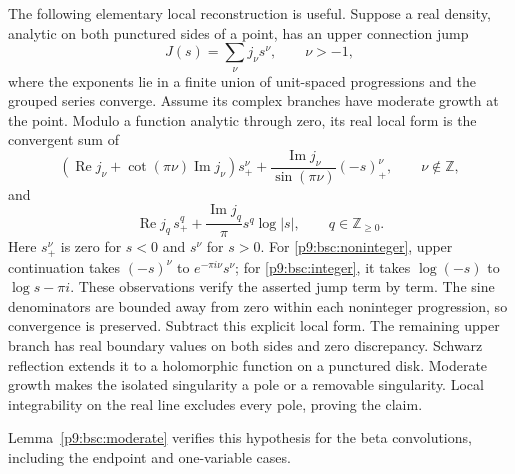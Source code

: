 \documentclass[11pt,a4paper]{article}
\theoremstyle{definition}
\theoremstyle{remark}
\numberwithin{equation}{section}
\begin{document}
The following elementary local reconstruction is useful. Suppose a
real density, analytic on both punctured sides of a point, has an
upper connection jump
\[
 J(s)=\sum_{\nu}j_\nu s^\nu,\qquad \nu>-1,
\]
where the exponents lie in a finite union of unit-spaced progressions
and the grouped series converge. Assume its complex branches have
moderate growth at the point. Modulo a function analytic through
zero, its real local form is the convergent sum of
\begin{equation}\label{p9:bsc:noninteger}
 \left(\operatorname{Re}j_\nu+
       \cot(\pi\nu)\operatorname{Im}j_\nu\right)s_+^\nu
 +\frac{\operatorname{Im}j_\nu}{\sin(\pi\nu)}(-s)_+^\nu,
 \qquad \nu\notin\mathbb Z,
\end{equation}
and
\begin{equation}\label{p9:bsc:integer}
 \operatorname{Re}j_q\,s_+^q+
       \frac{\operatorname{Im}j_q}{\pi}s^q\log|s|,
 \qquad q\in\mathbb Z_{\ge0}.
\end{equation}
Here $s_+^\nu$ is zero for $s<0$ and $s^\nu$ for $s>0$.
For \eqref{p9:bsc:noninteger}, upper continuation takes
$(-s)^\nu$ to $e^{-\pi i\nu}s^\nu$; for
\eqref{p9:bsc:integer}, it takes $\log(-s)$ to $\log s-\pi i$.
These observations verify the asserted jump term by term. The sine
denominators are bounded away from zero within each noninteger
progression, so convergence is preserved. Subtract this explicit
local form. The remaining upper branch has real boundary values
on both sides and zero discrepancy. Schwarz reflection extends it
to a holomorphic function on a punctured disk. Moderate growth makes
the isolated singularity a pole or a removable singularity. Local
integrability on the real line excludes every pole, proving the claim.

Lemma~\ref{p9:bsc:moderate} verifies this hypothesis for the beta
convolutions, including the endpoint and one-variable cases.
\end{document}
